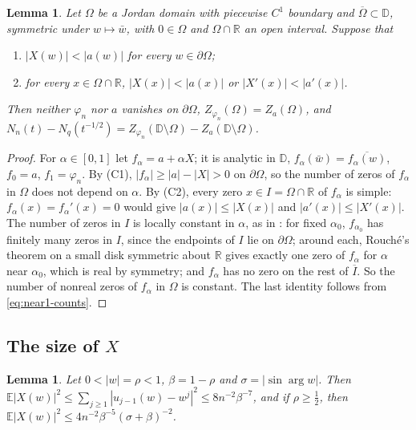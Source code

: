 \documentclass[11pt]{amsart}
\newtheorem{lemma}[theorem]{Lemma}
\theoremstyle{definition}
\theoremstyle{remark}
\numberwithin{equation}{section}
\newcommand{\R}{\mathbb{R}}
\newcommand{\D}{\mathbb{D}}
\newcommand{\E}{\mathbb{E}}
\begin{document}
\begin{lemma}\label{lem:near1-count}
Let $\Omega$ be a Jordan domain with piecewise $C^1$ boundary and $\overline\Omega\subset\D$, symmetric under $w\mapsto\bar w$, with $0\in\Omega$ and $\Omega\cap\R$ an open interval. Suppose that
\begin{enumerate}
\item[(C1)] $|X(w)|<|a(w)|$ for every $w\in\partial\Omega$;
\item[(C2)] for every $x\in\Omega\cap\R$, $|X(x)|<|a(x)|$ or $|X'(x)|<|a'(x)|$.
\end{enumerate}
Then neither $\varphi_n$ nor $a$ vanishes on $\partial\Omega$, $Z_{\varphi_n}(\Omega)=Z_a(\Omega)$, and $N_n(t)-N_q(t^{-1/2})=Z_{\varphi_n}(\D\setminus\Omega)-Z_a(\D\setminus\Omega)$.
\end{lemma}

\begin{proof}
For $\alpha\in[0,1]$ let $f_\alpha=a+\alpha X$; it is analytic in $\D$, $f_\alpha(\bar w)=\overline{f_\alpha(w)}$, $f_0=a$, $f_1=\varphi_n$. By (C1), $|f_\alpha|\ge|a|-|X|>0$ on $\partial\Omega$, so the number of zeros of $f_\alpha$ in $\Omega$ does not depend on $\alpha$. By (C2), every zero $x\in I=\Omega\cap\R$ of $f_\alpha$ is simple: $f_\alpha(x)=f_\alpha'(x)=0$ would give $|a(x)|\le|X(x)|$ and $|a'(x)|\le|X'(x)|$. The number of zeros in $I$ is locally constant in $\alpha$, as in \cite[Lemma~\ref{M-lem:constancy}]{Main}: for fixed $\alpha_0$, $f_{\alpha_0}$ has finitely many zeros in $I$, since the endpoints of $I$ lie on $\partial\Omega$; around each, Rouch\'e's theorem on a small disk symmetric about $\R$ gives exactly one zero of $f_\alpha$ for $\alpha$ near $\alpha_0$, which is real by symmetry; and $f_\alpha$ has no zero on the rest of $\overline I$. So the number of nonreal zeros of $f_\alpha$ in $\Omega$ is constant. The last identity follows from \eqref{eq:near1-counts}.
\end{proof}

\subsection{The size of \texorpdfstring{$X$}{X}}

\begin{lemma}\label{lem:near1-var}
Let $0<|w|=\rho<1$, $\beta=1-\rho$ and $\sigma=|\sin\arg w|$. Then $\E|X(w)|^2\le\sum_{j\ge1}|u_{j-1}(w)-w^j|^2\le8n^{-2}\beta^{-7}$, and if $\rho\ge\frac12$, then $\E|X(w)|^2\le4n^{-2}\beta^{-5}(\sigma+\beta)^{-2}$.
\end{lemma}
\end{document}
